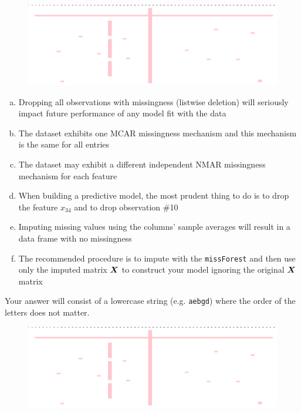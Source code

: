 \documentclass[12pt,landscape]{article}
\newcommand{\instr}{\small Your answer will consist of a lowercase string (e.g. \texttt{aebgd}) where the order of the letters does not matter. \normalsize}
\begin{document}
\begin{figure}[htp]
\centering
\includegraphics[width=7in]{missingness.png}
\end{figure}

\vspace{-0.2cm}\benum{}

\begin{enumerate}[(a)]
\item Dropping all observations with missingness (listwise deletion) will seriously impact future performance of any model fit with the data
\item The dataset exhibits one MCAR missingness mechanism and this mechanism is the same for all entries
\item The dataset may exhibit a different independent NMAR missingness mechanism for each feature
\item When building a predictive model, the most prudent thing to do is to drop the feature $x_{34}$ and to drop observation \#10 
\item Imputing missing values using the columns' sample averages will result in a data frame with no missingness
\item The recommended procedure is to impute with the \texttt{missForest} and then use only the imputed matrix $\boldsymbol{X}$ to construct your model ignoring the original $\boldsymbol{X}$ matrix
\end{enumerate}
\eenum\instr\pagebreak


\problem{} 

\begin{figure}[htp]
\centering
\includegraphics[width=7in]{missingness.png}
\end{figure}
\end{document}
